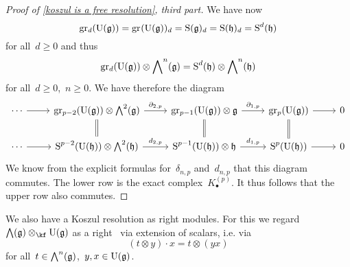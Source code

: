 \begin{proof}[Proof of \cref{koszul is a free resolution}, third part]
  We have now
  \[
    \gr[d](\Univ(\glie))
    =
    \gr(\Univ(\glie))_d
    =
    \Symm(\glie)_d
    =
    \Symm(\hlie)_d
    =
    \Symm^d(\hlie)
  \]
  for all~$d \geq 0$ and thus
  \[
    \gr[d]( \Univ(\glie) ) \otimes \Exterior^n(\glie)
    =
    \Symm^d( \hlie ) \otimes \Exterior^n(\hlie)
  \]
  for all~$d \geq 0$,~$n \geq 0$.
  We have therefore the diagram
  \[
    \begin{tikzcd}
      \dotsb
      \arrow{r}
      &
      \gr[p-2]( \Univ(\glie) ) \otimes \Exterior^2(\glie)
      \arrow{r}[above]{\del_{2,p}}
      \arrow[equal]{d}
      &
      \gr[p-1]( \Univ(\glie) ) \otimes \glie
      \arrow{r}[above]{\del_{1,p}}
      \arrow[equal]{d}
      &
      \gr[p]( \Univ(\glie) )
      \arrow{r}
      \arrow[equal]{d}
      &
      0
      \\
      \dotsb
      \arrow{r}
      &
      \Symm^{p-2}( \Univ(\hlie) ) \otimes \Exterior^2(\hlie)
      \arrow{r}[above]{d_{2,p}}
      &
      \Symm^{p-1}( \Univ(\hlie) ) \otimes \hlie
      \arrow{r}[above]{d_{1,p}}
      &
      \Symm^p( \Univ(\hlie) )
      \arrow{r}
      &
      0
    \end{tikzcd}
  \]
  We know from the explicit formulas for~$\delta_{n,p}$ and~$d_{n,p}$ that this diagram commutes.
  The lower row is the exact complex~$K^{(p)}_\bullet$.
  It thus follows that the upper row also commutes.
\end{proof}


\begin{fluff}
  We also have a Koszul resolution as right modules.
  For this we regard~$\Exterior(\glie) \otimes_{\kf} \Univ(\glie)$ as a right~\module{$\Univ(\glie)$} via extension of scalars, i.e. via
  \[
    (t \otimes y) \cdot x
    =
    t \otimes (yx)
  \]
  for all~$t \in \operatorname{\bigwedge}^n(\mathfrak{g})$,~$y, x \in \operatorname{U}(\mathfrak{g})$.
\end{fluff}


